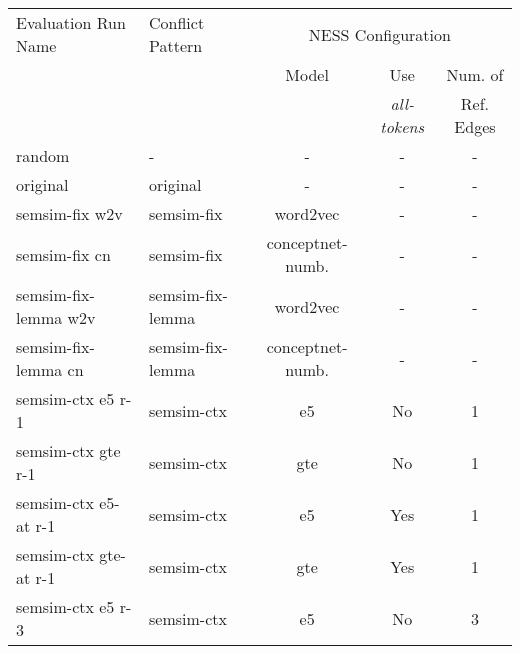 \documentclass[11pt]{scrreprt}
\begin{document}
\begin{table}
\centering
\begin{tabular}{llccc}
\toprule
\multicolumn{1}{l}{Evaluation Run Name} & \multicolumn{1}{l}{Conflict Pattern} & \multicolumn{3}{c}{NESS Configuration} \\
\cmidrule{3-5}
\multicolumn{1}{l}{}   & \multicolumn{1}{l}{}  & \multicolumn{1}{c}{Model}	& \multicolumn{1}{c}{Use} & \multicolumn{1}{c}{Num. of} \\
\multicolumn{3}{l}{}   & \multicolumn{1}{c}{\textit{all-tokens}}  & \multicolumn{1}{c}{Ref. Edges}\\
\midrule
random							& -				& -                          & -                                         & - \\
original                       & original                     & -                          & -                                         & - \\
semsim-fix w2v                 & semsim-fix                   & word2vec                   & -                                         & - \\
semsim-fix cn                 & semsim-fix                   & conceptnet-numb.                      & -                                         & - \\
semsim-fix-lemma w2v           & semsim-fix-lemma             & word2vec                   & -                                         & - \\
semsim-fix-lemma cn           & semsim-fix-lemma             & conceptnet-numb.                      & -                                         & - \\
semsim-ctx e5 r-1                & semsim-ctx                   & e5                         & No                                        & 1 \\
semsim-ctx gte r-1               & semsim-ctx                   & gte                        & No                                        & 1 \\
semsim-ctx e5-at r-1             & semsim-ctx                   & e5                         & Yes                                       & 1 \\
semsim-ctx gte-at r-1            & semsim-ctx                   & gte                        & Yes                                       & 1 \\
semsim-ctx e5 r-3                & semsim-ctx                   & e5                         & No                                        & 3 \\

\end{tabular}
\end{table}
\end{document}
